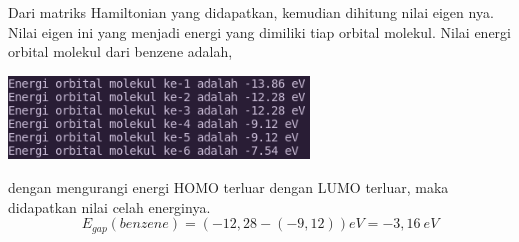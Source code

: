\documentclass[12pt,a4paper]{report}
\begin{document}
Dari matriks Hamiltonian yang didapatkan, kemudian dihitung nilai eigen nya. Nilai eigen ini yang menjadi energi yang dimiliki tiap orbital molekul. Nilai energi orbital molekul dari benzene adalah,
\begin{center}
	\includegraphics[width=8cm]{gambar/benzene-energy.png}
	\label{benzene_energy}
\end{center}
dengan mengurangi energi HOMO terluar dengan LUMO terluar, maka didapatkan nilai celah energinya.
\begin{equation}
E_{gap} (benzene) = (-12,28 - (-9,12)) eV = -3,16 \ eV
\end{equation}
\end{document}
